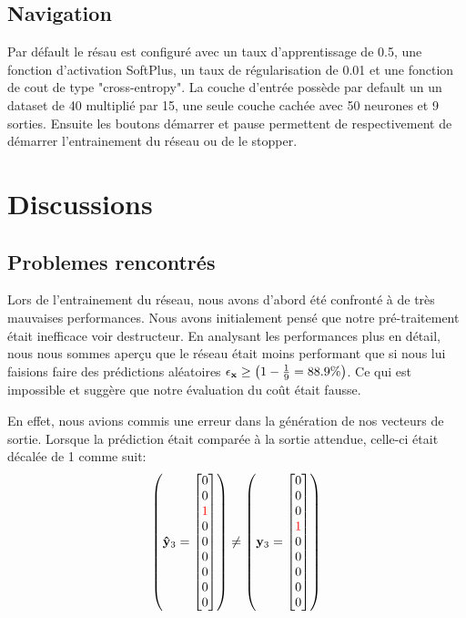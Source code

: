 \documentclass[11pt]{article}
\begin{document}
\subsection{Navigation}
Par d\'efault le r\'esau est configur\'e avec un taux d'apprentissage de 0.5,
une fonction d'activation SoftPlus, un taux de r\'egularisation de 0.01 et une
fonction de cout de type "cross-entropy". La couche d'entr\'ee poss\`ede par
default un un dataset de 40 multipli\'e par 15, une seule couche cach\'ee avec
50 neurones et 9 sorties. Ensuite les boutons d\'emarrer et pause permettent
de respectivement de d\'emarrer l'entrainement du r\'eseau ou de le stopper.



\section{Discussions}
\subsection{Problemes rencontr\'es}
Lors de l'entrainement du r\'eseau, nous avons d'abord \'et\'e confront\'e \`a
de tr\`es mauvaises performances. Nous avons initialement pens\'e que notre
pr\'e-traitement \'etait inefficace voir destructeur. En analysant les
performances plus en d\'etail,
nous nous sommes aper\c cu que le r\'eseau \'etait moins performant que si
nous lui faisions faire des pr\'edictions al\'eatoires
$\epsilon_{\bf x} \ge \left (1 - \frac{1}{9} = 88.9\% \right)$.
Ce qui est impossible et sugg\`ere que notre \'evaluation du co\^ut \'etait fausse.

En effet, nous avions commis une erreur dans la g\'en\'eration de nos vecteurs de
sortie. Lorsque la pr\'ediction \'etait compar\'ee \`a la sortie attendue,
celle-ci \'etait d\'ecal\'ee de 1 comme suit:
\begin{equation}
	\left (
	{\bf \hat y}_3 =
	\begin{bmatrix}
		0 \\
		0 \\
		{\color{red} 1 }\\
		0 \\
		0 \\
		0 \\
		0 \\
		0 \\
		0 \\
	\end{bmatrix}
	\right )
	\ne
	\left (
	{\bf y}_3 =
	\begin{bmatrix}
		0 \\
		0 \\
		0 \\
		{\color{red} 1 }\\
		0 \\
		0 \\
		0 \\
		0 \\
		0 \\
	\end{bmatrix}
	\right )
\end{equation}
\end{document}
